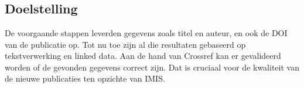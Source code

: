 
\chapter{}%
\label{ch:crossref}

\section{Doelstelling}
De voorgaande stappen leverden gegevens zoals titel en auteur, en ook de DOI van de publicatie op. Tot nu toe zijn al die resultaten gebaseerd op tekstverwerking en linked data. Aan de hand van Crossref kan er gevalideerd worden of de gevonden gegevens correct zijn. Dat is cruciaal voor de kwaliteit van de nieuwe publicaties ten opzichte van IMIS.
